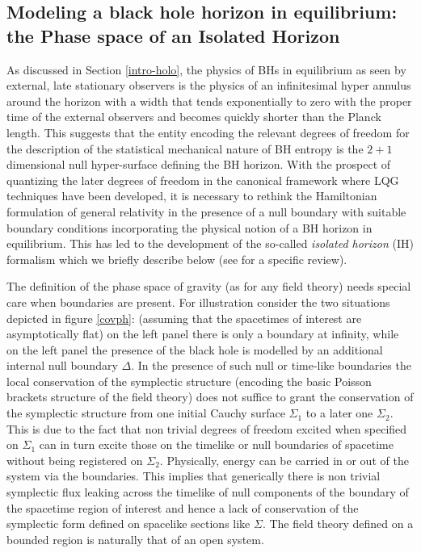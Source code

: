 \documentclass[aps, nofootinbib,superscriptaddress,12pt]{revtex4-2}
\begin{document}
\subsection{Modeling a black hole horizon in equilibrium: the Phase space of an Isolated Horizon}\label{mbhs}

As discussed in Section \ref{intro-holo}, the physics of BHs in equilibrium as seen by external, late stationary observers
is the physics of an infinitesimal hyper annulus around the horizon with a width that tends exponentially to zero with the proper 
time of the external observers and becomes quickly shorter than the Planck length. This suggests that the entity 
encoding the relevant degrees of freedom for the description of the statistical mechanical nature of BH entropy is the 
$2+1$ dimensional null hyper-surface defining the BH horizon. With the prospect of quantizing the later degrees of freedom in the canonical framework where LQG techniques have been developed, it is necessary to rethink the Hamiltonian formulation of general relativity in the presence of a null boundary 
with suitable boundary conditions incorporating the physical notion of a BH horizon in equilibrium. 
This has led to the development of  the so-called {\em isolated horizon} (IH) formalism which we briefly describe below (see \cite{Ashtekar:2004cn} for a specific review).
 
 The definition of the 
phase space of gravity (as for any field theory) needs special care when boundaries are present. For illustration consider the two situations depicted in figure \ref{covph}: (assuming that the spacetimes of interest are asymptotically flat) on the left panel there is only a boundary at infinity, while on the left panel  the presence of the black hole is modelled by an additional  internal null boundary $\Delta$. In the presence of such null or time-like boundaries the local conservation of the symplectic structure (encoding the basic Poisson brackets structure of the field theory) does not suffice to grant the conservation of the symplectic structure from one initial Cauchy surface $\Sigma_1$ to a later one $\Sigma_2$. 
This is due to the fact that non trivial degrees of freedom excited when specified on $\Sigma_1$ can in turn excite those on the timelike or null boundaries of spacetime without being registered on $\Sigma_2$. Physically, energy can be carried in or out of the system via the boundaries. This implies that generically there is non trivial symplectic flux leaking across the timelike of null components of the boundary of the spacetime region of interest and hence a lack of conservation of the symplectic form defined on spacelike sections like $\Sigma$. The field theory defined on a bounded region is naturally that of an open system.
\end{document}
